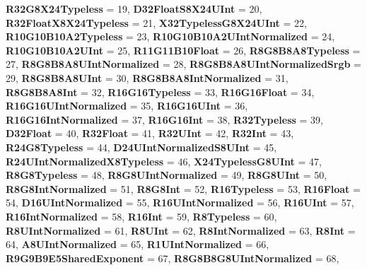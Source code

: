 \begin{DoxyCompactItemize}
{\bfseries R32\+G8\+X24\+Typeless} = 19, 
{\bfseries D32\+Float\+S8\+X24\+U\+Int} = 20, 
{\bfseries R32\+Float\+X8\+X24\+Typeless} = 21, 
{\bfseries X32\+Typeless\+G8\+X24\+U\+Int} = 22, 
\newline
{\bfseries R10\+G10\+B10\+A2\+Typeless} = 23, 
{\bfseries R10\+G10\+B10\+A2\+U\+Int\+Normalized} = 24, 
{\bfseries R10\+G10\+B10\+A2\+U\+Int} = 25, 
{\bfseries R11\+G11\+B10\+Float} = 26, 
\newline
{\bfseries R8\+G8\+B8\+A8\+Typeless} = 27, 
{\bfseries R8\+G8\+B8\+A8\+U\+Int\+Normalized} = 28, 
{\bfseries R8\+G8\+B8\+A8\+U\+Int\+Normalized\+Srgb} = 29, 
{\bfseries R8\+G8\+B8\+A8\+U\+Int} = 30, 
\newline
{\bfseries R8\+G8\+B8\+A8\+Int\+Normalized} = 31, 
{\bfseries R8\+G8\+B8\+A8\+Int} = 32, 
{\bfseries R16\+G16\+Typeless} = 33, 
{\bfseries R16\+G16\+Float} = 34, 
\newline
{\bfseries R16\+G16\+U\+Int\+Normalized} = 35, 
{\bfseries R16\+G16\+U\+Int} = 36, 
{\bfseries R16\+G16\+Int\+Normalized} = 37, 
{\bfseries R16\+G16\+Int} = 38, 
\newline
{\bfseries R32\+Typeless} = 39, 
{\bfseries D32\+Float} = 40, 
{\bfseries R32\+Float} = 41, 
{\bfseries R32\+U\+Int} = 42, 
\newline
{\bfseries R32\+Int} = 43, 
{\bfseries R24\+G8\+Typeless} = 44, 
{\bfseries D24\+U\+Int\+Normalized\+S8\+U\+Int} = 45, 
{\bfseries R24\+U\+Int\+Normalized\+X8\+Typeless} = 46, 
\newline
{\bfseries X24\+Typeless\+G8\+U\+Int} = 47, 
{\bfseries R8\+G8\+Typeless} = 48, 
{\bfseries R8\+G8\+U\+Int\+Normalized} = 49, 
{\bfseries R8\+G8\+U\+Int} = 50, 
\newline
{\bfseries R8\+G8\+Int\+Normalized} = 51, 
{\bfseries R8\+G8\+Int} = 52, 
{\bfseries R16\+Typeless} = 53, 
{\bfseries R16\+Float} = 54, 
\newline
{\bfseries D16\+U\+Int\+Normalized} = 55, 
{\bfseries R16\+U\+Int\+Normalized} = 56, 
{\bfseries R16\+U\+Int} = 57, 
{\bfseries R16\+Int\+Normalized} = 58, 
\newline
{\bfseries R16\+Int} = 59, 
{\bfseries R8\+Typeless} = 60, 
{\bfseries R8\+U\+Int\+Normalized} = 61, 
{\bfseries R8\+U\+Int} = 62, 
\newline
{\bfseries R8\+Int\+Normalized} = 63, 
{\bfseries R8\+Int} = 64, 
{\bfseries A8\+U\+Int\+Normalized} = 65, 
{\bfseries R1\+U\+Int\+Normalized} = 66, 
\newline
{\bfseries R9\+G9\+B9\+E5\+Shared\+Exponent} = 67, 
{\bfseries R8\+G8\+B8\+G8\+U\+Int\+Normalized} = 68, 

\end{DoxyCompactItemize}

